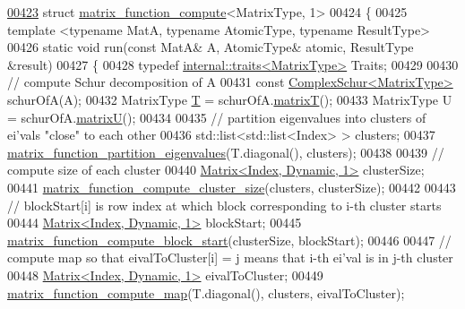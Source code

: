 \begin{DoxyCode}
\hyperlink{struct_eigen_1_1internal_1_1matrix__function__compute_3_01_matrix_type_00_011_01_4}{00423} \textcolor{keyword}{struct }\hyperlink{struct_eigen_1_1internal_1_1matrix__function__compute}{matrix\_function\_compute}<MatrixType, 1>
00424 \{
00425   \textcolor{keyword}{template} <\textcolor{keyword}{typename} MatA, \textcolor{keyword}{typename} AtomicType, \textcolor{keyword}{typename} ResultType>
00426   \textcolor{keyword}{static} \textcolor{keywordtype}{void} run(\textcolor{keyword}{const} MatA& A, AtomicType& atomic, ResultType &result)
00427   \{
00428     \textcolor{keyword}{typedef} \hyperlink{struct_eigen_1_1internal_1_1traits}{internal::traits<MatrixType>} Traits;
00429     
00430     \textcolor{comment}{// compute Schur decomposition of A}
00431     \textcolor{keyword}{const} \hyperlink{group___eigenvalues___module}{ComplexSchur<MatrixType>} schurOfA(A);  
00432     MatrixType \hyperlink{group___sparse_core___module}{T} = schurOfA.\hyperlink{group___eigenvalues___module_add3ab5ed83f7f2f06b79fa910a2d5684}{matrixT}();
00433     MatrixType U = schurOfA.\hyperlink{group___eigenvalues___module_afed8177cf9836f032d42bdb6c6bc6e01}{matrixU}();
00434 
00435     \textcolor{comment}{// partition eigenvalues into clusters of ei'vals "close" to each other}
00436     std::list<std::list<Index> > clusters; 
00437     \hyperlink{namespace_eigen_1_1internal_a9291a6ab4fe0ad1346049a8f2feddeaa}{matrix\_function\_partition\_eigenvalues}(T.diagonal(), clusters);
00438 
00439     \textcolor{comment}{// compute size of each cluster}
00440     \hyperlink{group___core___module_class_eigen_1_1_matrix}{Matrix<Index, Dynamic, 1>} clusterSize;
00441     \hyperlink{namespace_eigen_1_1internal_a1073ba7ac499827baa04c814e4251326}{matrix\_function\_compute\_cluster\_size}(clusters, clusterSize);
00442 
00443     \textcolor{comment}{// blockStart[i] is row index at which block corresponding to i-th cluster starts }
00444     \hyperlink{group___core___module_class_eigen_1_1_matrix}{Matrix<Index, Dynamic, 1>} blockStart; 
00445     \hyperlink{namespace_eigen_1_1internal_a2144f635d30028a25e7eb3510c315ad3}{matrix\_function\_compute\_block\_start}(clusterSize, blockStart);
00446 
00447     \textcolor{comment}{// compute map so that eivalToCluster[i] = j means that i-th ei'val is in j-th cluster }
00448     \hyperlink{group___core___module_class_eigen_1_1_matrix}{Matrix<Index, Dynamic, 1>} eivalToCluster;
00449     \hyperlink{namespace_eigen_1_1internal_ade67364a006320cd7103f0f3366def09}{matrix\_function\_compute\_map}(T.diagonal(), clusters, eivalToCluster);

\end{DoxyCode}

